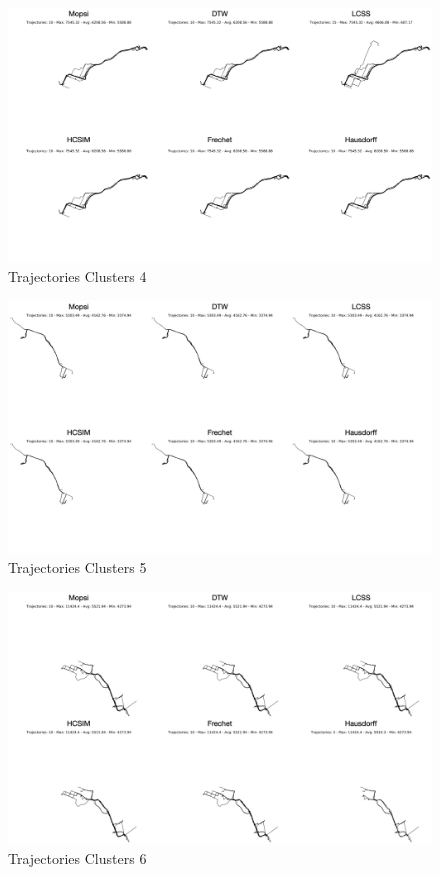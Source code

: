 \documentclass[a4paper, 12pt]{article}
\begin{document}
\begin{figure}[htbp!]
    \centering
    \includegraphics[width=1\textwidth]{Mopsi Clusters 4.png}
    \caption{Trajectories Clusters 4}
    \label{fig30}
\end{figure}

\begin{figure}[htbp!]
    \centering
    \includegraphics[width=1\textwidth]{Mopsi Clusters 5.png}
    \caption{Trajectories Clusters 5}
    \label{fig31}
\end{figure}

\begin{figure}[htbp!]
    \centering
    \includegraphics[width=1\textwidth]{Mopsi Clusters 6.png}
    \caption{Trajectories Clusters 6}
    \label{fig32}
\end{figure}
\end{document}

